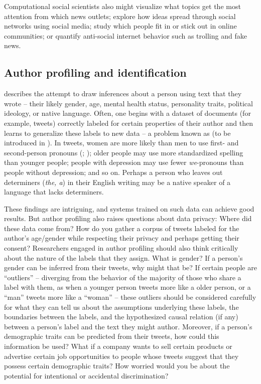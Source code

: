 Computational social scientists also might visualize what topics get
the most attention from which news outlets; explore how ideas spread
through social networks using social media; study which people fit in
or stick out in online communities; or quantify anti-social internet
behavior such as trolling and fake news.

\subsection{Author profiling and identification}

 describes the attempt to draw
inferences about a person using text that they wrote -- their likely
gender, age, mental health status, personality traits, political
ideology, or native language.  Often, one begins with a dataset of
documents (for example, tweets) correctly labeled for certain
properties of their author and then learns to generalize these labels
to new data -- a problem known as  (to be
introduced in ).  In tweets,
women are more likely than men to use first- and second-person
pronouns (; \citealt{Bamman-etal:2014}); older people may use more standardized spelling than younger
people; people with depression may use fewer \textit{we}-pronouns than
people without depression; and so on. Perhaps a person who leaves out
determiners (\textit{the, a}) in their English writing may be a
native speaker of a language that lacks determiners.


These findings are intriguing, and systems trained on such data can
achieve good results.  But author profiling also raises questions
about data privacy: Where did these data come from?  How do you gather
a corpus of tweets labeled for the author's age/gender while
respecting their privacy and perhaps getting their consent?
Researchers engaged in author profiling should also think critically
about the nature of the labels that they assign.  What is gender?  If
a person's gender can be inferred from their tweets, why might that
be?  If certain people are ``outliers'' -- diverging from the behavior
of the majority of those who share a label with them, as when a
younger person tweets more like a older person, or a ``man'' tweets
more like a ``woman'' -- these outliers should be considered carefully
for what they can tell us about the assumptions underlying these
labels, the boundaries between the labels, and the hypothesized causal
relation (if any) between a person's label and the text they might
author.  Moreover, if a person's demographic traits can be predicted from their tweets, how could this information be used?  What if a company wants to sell certain products or advertise certain job opportunities to people whose tweets suggest that they possess certain demographic traits?  How worried would you be about the potential for intentional or accidental discrimination?

